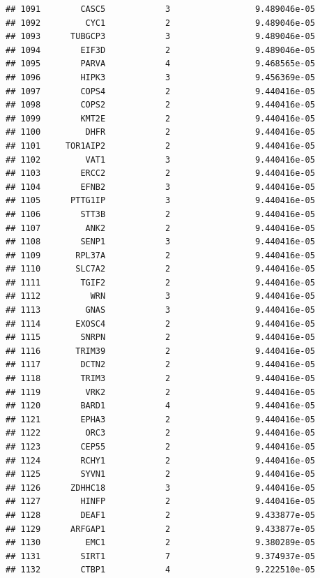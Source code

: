\documentclass[
]{article}
\begin{document}
\begin{verbatim}
## 1091        CASC5            3                 9.489046e-05
## 1092         CYC1            2                 9.489046e-05
## 1093      TUBGCP3            3                 9.489046e-05
## 1094        EIF3D            2                 9.489046e-05
## 1095        PARVA            4                 9.468565e-05
## 1096        HIPK3            3                 9.456369e-05
## 1097        COPS4            2                 9.440416e-05
## 1098        COPS2            2                 9.440416e-05
## 1099        KMT2E            2                 9.440416e-05
## 1100         DHFR            2                 9.440416e-05
## 1101     TOR1AIP2            2                 9.440416e-05
## 1102         VAT1            3                 9.440416e-05
## 1103        ERCC2            2                 9.440416e-05
## 1104        EFNB2            3                 9.440416e-05
## 1105      PTTG1IP            3                 9.440416e-05
## 1106        STT3B            2                 9.440416e-05
## 1107         ANK2            2                 9.440416e-05
## 1108        SENP1            3                 9.440416e-05
## 1109       RPL37A            2                 9.440416e-05
## 1110       SLC7A2            2                 9.440416e-05
## 1111        TGIF2            2                 9.440416e-05
## 1112          WRN            3                 9.440416e-05
## 1113         GNAS            3                 9.440416e-05
## 1114       EXOSC4            2                 9.440416e-05
## 1115        SNRPN            2                 9.440416e-05
## 1116       TRIM39            2                 9.440416e-05
## 1117        DCTN2            2                 9.440416e-05
## 1118        TRIM3            2                 9.440416e-05
## 1119         VRK2            2                 9.440416e-05
## 1120        BARD1            4                 9.440416e-05
## 1121        EPHA3            2                 9.440416e-05
## 1122         ORC3            2                 9.440416e-05
## 1123        CEP55            2                 9.440416e-05
## 1124        RCHY1            2                 9.440416e-05
## 1125        SYVN1            2                 9.440416e-05
## 1126      ZDHHC18            3                 9.440416e-05
## 1127        HINFP            2                 9.440416e-05
## 1128        DEAF1            2                 9.433877e-05
## 1129      ARFGAP1            2                 9.433877e-05
## 1130         EMC1            2                 9.380289e-05
## 1131        SIRT1            7                 9.374937e-05
## 1132        CTBP1            4                 9.222510e-05

\end{verbatim}
\end{document}
